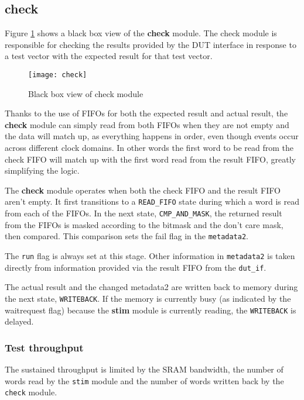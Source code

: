 \subsection{check}
Figure \ref{fig:bb_check} shows a black box view of the \textbf{check} module.
The check module is responsible for checking the results provided by the DUT interface
in response to a test vector with the expected result for that test vector.

\begin{figure}
 \centering
 \texttt{[image: check]}
 \caption{Black box view of check module}
 \label{fig:bb_check}
\end{figure}


Thanks to the use of FIFOs for both the expected result and actual result, the
\textbf{check} module can simply read from both FIFOs when they are not empty and
the data will match up, as everything happens in order, even though events occur
across different clock domains. In other words the first word to be read from the
check FIFO will match up with the first word read from the result FIFO, greatly
simplifying the logic.

The \textbf{check} module operates when both the check FIFO and the result FIFO aren't
empty. It first transitions to a \texttt{READ\_FIFO} state during which a word
is read from each of the FIFOs. In the next state, \texttt{CMP\_AND\_MASK}, the
returned result from the FIFOs is masked according to the bitmask and the don't care
mask, then compared. This comparison sets the fail flag in the \texttt{metadata2}.

The \texttt{run} flag is always set at this stage. Other information in \texttt{metadata2}
is taken directly from information provided via the result FIFO from the \texttt{dut\_if}.

The actual result and the changed metadata2 are written back to memory during the next state,
\texttt{WRITEBACK}. If the memory is currently busy (as indicated by the waitrequest flag)
because the \textbf{stim} module is currently reading, the \texttt{WRITEBACK} is delayed.

\subsubsection{Test throughput}
The sustained throughput is limited by the SRAM bandwidth, the number of words read by
the \texttt{stim} module and the number of words written back by the \texttt{check} module.

